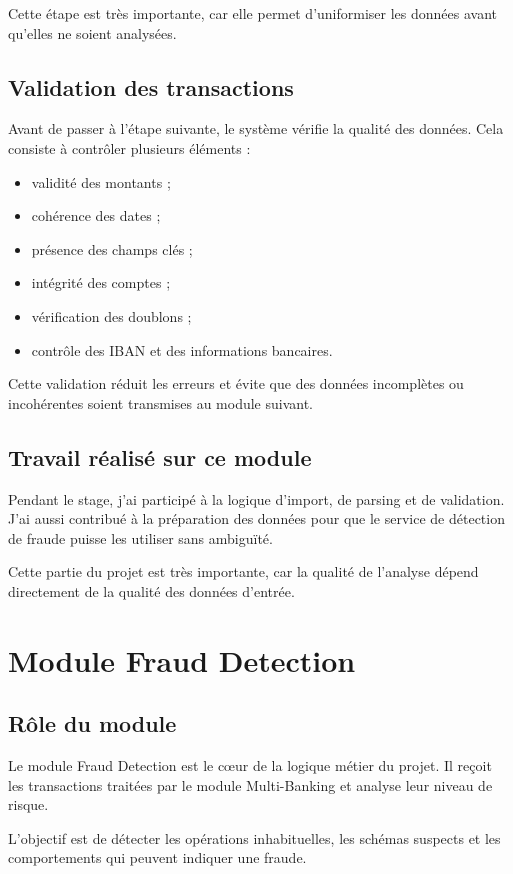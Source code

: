 ﻿\documentclass[12pt,a4paper]{report}
\begin{document}
Cette étape est très importante, car elle permet d'uniformiser les données avant qu'elles ne soient analysées.

\section{Validation des transactions}
Avant de passer à l'étape suivante, le système vérifie la qualité des données. Cela consiste à contrôler plusieurs éléments :
\begin{itemize}[leftmargin=1.5em]
    \item validité des montants ;
    \item cohérence des dates ;
    \item présence des champs clés ;
    \item intégrité des comptes ;
    \item vérification des doublons ;
    \item contrôle des IBAN et des informations bancaires.
\end{itemize}

Cette validation réduit les erreurs et évite que des données incomplètes ou incohérentes soient transmises au module suivant.

\section{Travail réalisé sur ce module}
Pendant le stage, j'ai participé à la logique d'import, de parsing et de validation. J'ai aussi contribué à la préparation des données pour que le service de détection de fraude puisse les utiliser sans ambiguïté.

Cette partie du projet est très importante, car la qualité de l'analyse dépend directement de la qualité des données d'entrée.

\chapter{Module Fraud Detection}
\section{Rôle du module}
Le module Fraud Detection est le cœur de la logique métier du projet. Il reçoit les transactions traitées par le module Multi-Banking et analyse leur niveau de risque.

L'objectif est de détecter les opérations inhabituelles, les schémas suspects et les comportements qui peuvent indiquer une fraude.
\end{document}
